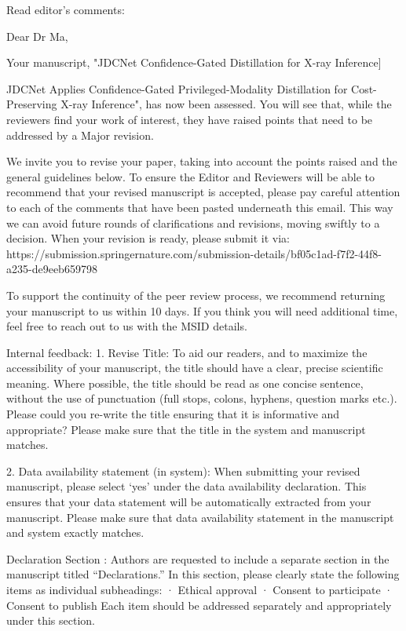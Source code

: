 Read editor’s comments:

Dear Dr Ma,

Your manuscript, "JDCNet Confidence-Gated Distillation for X-ray Inference]{JDCNet Applies Confidence-Gated Privileged-Modality Distillation for Cost-Preserving X-ray Inference", has now been assessed. You will see that, while the reviewers find your work of interest, they have raised points that need to be addressed by a Major revision.

We invite you to revise your paper, taking into account the points raised and the general guidelines below. To ensure the Editor and Reviewers will be able to recommend that your revised manuscript is accepted, please pay careful attention to each of the comments that have been pasted underneath this email. This way we can avoid future rounds of clarifications and revisions, moving swiftly to a decision. When your revision is ready, please submit it via: https://submission.springernature.com/submission-details/bf05c1ad-f7f2-44f8-a235-de9eeb659798

To support the continuity of the peer review process, we recommend returning your manuscript to us within 10 days. If you think you will need additional time, feel free to reach out to us with the MSID details.

Internal feedback:
1. Revise Title: To aid our readers, and to maximize the accessibility of your manuscript, the title should have a clear, precise scientific meaning. Where possible, the title should be read as one concise sentence, without the use of punctuation (full stops, colons, hyphens, question marks etc.). Please could you re-write the title ensuring that it is informative and appropriate?
Please make sure that the title in the system and manuscript matches.

2. Data availability statement (in system): When submitting your revised manuscript, please select ‘yes’ under the data availability declaration. This ensures that your data statement will be automatically extracted from your manuscript. Please make sure that data availability statement in the manuscript and system exactly matches.

Declaration Section : Authors are requested to include a separate section in the manuscript titled “Declarations.” In this section, please clearly state the following items as individual subheadings:
· Ethical approval
· Consent to participate
· Consent to publish
Each item should be addressed separately and appropriately under this section.


}
